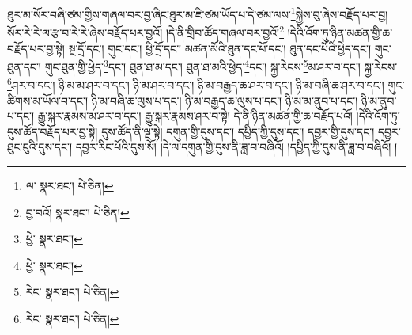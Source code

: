 ཐུར་མ་སོར་བཞི་ཙམ་གྱིས་གཞལ་བར་བྱ་ཞིང་ཐུར་མ་ཇི་ཙམ་ཡོད་པ་དེ་ཙམ་ལས་\footnote{ལ་  སྣར་ཐང་།  པེ་ཅིན། }སྐྱེས་བུ་ཞེས་བརྗོད་པར་བྱ། སོར་རེ་རེ་ལ་རྩ་བ་རེ་རེ་ཞེས་བརྗོད་པར་བྱའོ། །དེ་ནི་གྲིབ་ཚོད་གཞལ་བར་བྱའོ།\footnote{བྱ་བའོ།  སྣར་ཐང་།  པེ་ཅིན། } །དེའི་འོག་ཏུ་ཉིན་མཚན་གྱི་ཆ་བརྗོད་པར་བྱ་སྟེ། སྔ་དྲོ་དང་། གུང་དང་། ཕྱི་དྲོ་དང་། མཚན་མོའི་ཐུན་དང་པོ་དང་། ཐུན་དང་པོའི་ཕྱེད་དང་། གུང་ཐུན་དང་། གུང་ཐུན་གྱི་ཕྱེད་\footnote{ཕྱེ་  སྣར་ཐང་། }དང་། ཐུན་ཐ་མ་དང་། ཐུན་ཐ་མའི་ཕྱེད་\footnote{ཕྱེ་  སྣར་ཐང་། }དང་། སྐྱ་རེངས་\footnote{རེང་  སྣར་ཐང་།  པེ་ཅིན། }མ་ཤར་བ་དང་། སྐྱ་རེངས་\footnote{རེང་  སྣར་ཐང་།  པེ་ཅིན། }ཤར་བ་དང་། ཉི་མ་མ་ཤར་བ་དང་། ཉི་མ་ཤར་བ་དང་། ཉི་མ་བརྒྱད་ཆ་ཤར་བ་དང་། ཉི་མ་བཞི་ཆ་ཤར་བ་དང་། གུང་ཚིགས་མ་ཡོལ་བ་དང་། ཉི་མ་བཞི་ཆ་ལུས་པ་དང་། ཉི་མ་བརྒྱད་ཆ་ལུས་པ་དང་། ཉི་མ་མ་ནུབ་པ་དང་། ཉི་མ་ནུབ་པ་དང་། རྒྱུ་སྐར་རྣམས་མ་ཤར་བ་དང་། རྒྱུ་སྐར་རྣམས་ཤར་བ་སྟེ། དེ་ནི་ཉིན་མཚན་གྱི་ཆ་བརྗོད་པའོ། །དེའི་འོག་ཏུ་དུས་ཚོད་བརྗོད་པར་བྱ་སྟེ། དུས་ཚོད་ནི་ལྔ་སྟེ། དགུན་གྱི་དུས་དང་། དཔྱིད་ཀྱི་དུས་དང་། དབྱར་གྱི་དུས་དང་། དབྱར་ཐུང་ངུའི་དུས་དང་། དབྱར་རིང་པོའི་དུས་སོ། །དེ་ལ་དགུན་གྱི་དུས་ནི་ཟླ་བ་བཞིའོ། །དཔྱིད་ཀྱི་དུས་ནི་ཟླ་བ་བཞིའོ། །
